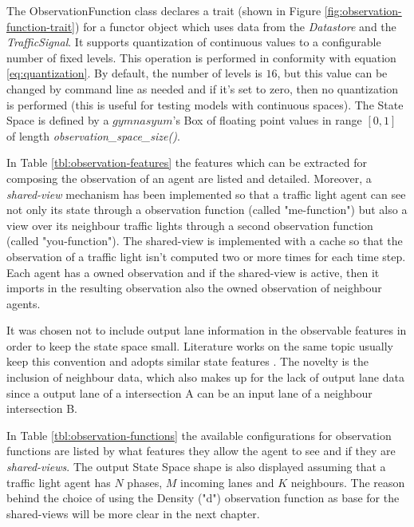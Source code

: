 The ObservationFunction class declares a trait (shown in Figure \ref{fig:observation-function-trait}) for a functor object which uses data from the \textit{Datastore} and the \textit{TrafficSignal}.
It supports quantization of continuous values to a configurable number of fixed levels. This operation is performed in conformity with equation \ref{eq:quantization}. By default, the number of levels is $16$, but this value can be changed by command line as needed and if it's set to zero, then no quantization is performed (this is useful for testing models with continuous spaces).
The State Space is defined by a $gymnasyum$'s Box of floating point values in range $[0, 1]$ of length \textit{observation\_space\_size()}.


In Table \ref{tbl:observation-features} the features which can be extracted for composing the observation of an agent are listed and detailed.
Moreover, a \textit{shared-view} mechanism has been implemented so that a traffic light agent can see not only its state through a observation function (called "me-function") but also a view over its neighbour traffic lights through a second observation function (called "you-function").
The shared-view is implemented with a cache so that the observation of a traffic light isn't computed two or more times for each time step.
Each agent has a owned observation and if the shared-view is active, then it imports in the resulting observation also the owned observation of neighbour agents.

It was chosen not to include output lane information in the observable features in order to keep the state space small. Literature works on the same topic usually keep this convention and adopts similar state features \cite{wei2019presslight} \cite{han2023leveraging}. The novelty is the inclusion of neighbour data, which also makes up for the lack of output lane data since a output lane of a intersection A can be an input lane of a neighbour intersection B.

In Table \ref{tbl:observation-functions} the available configurations for observation functions are listed by what features they allow the agent to see and if they are \textit{shared-views}. The output State Space shape is also displayed assuming that a traffic light agent has $N$ phases, $M$ incoming lanes and $K$ neighbours.
The reason behind the choice of using the Density ("d") observation function as base for the shared-views will be more clear in the next chapter.

